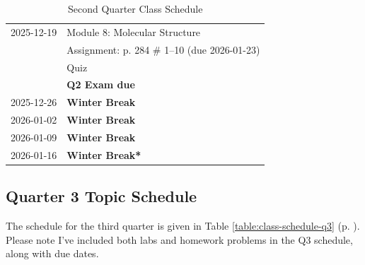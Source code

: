 \documentclass[11pt, oneside]{article}   	%
\begin{document}
\begin{table}[h]
\begin{tabular}{ l | l }
\hline
2025-12-19 & Module 8: Molecular Structure \\
                   & Assignment: p. 284 \# 1--10 (due 2026-01-23)\\
                   & Quiz \\
                   & \textbf{Q2 Exam due} \\

\hline
2025-12-26 & \textbf{Winter Break} \\

\hline
2026-01-02 & \textbf{Winter Break} \\

\hline
2026-01-09 & \textbf{Winter Break} \\
\hline
2026-01-16 & \textbf{Winter Break*} \\

\end{tabular}
\caption{Second Quarter Class Schedule}\label{table:class-schedule-q2}
\end{table}

\pagebreak
\subsection*{Quarter 3 Topic Schedule}
The schedule for the third quarter is given in Table \ref{table:class-schedule-q3} (p. \pageref{table:class-schedule-q3}).
Please note I've included both labs and homework problems in the Q3 schedule, along with due dates.
\end{document}
